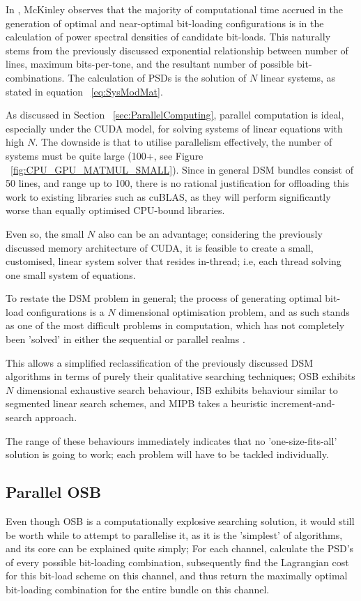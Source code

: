 In \cite{AM09}, McKinley observes that the majority of computational time accrued in the generation of optimal and near-optimal bit-loading configurations is in the calculation of power spectral densities of candidate bit-loads. This naturally stems from the previously discussed exponential relationship between number of lines, maximum bits-per-tone, and the resultant number of possible bit-combinations. The calculation of PSDs is the solution of \(N\) linear systems, as stated in equation ~\eqref{eq:SysModMat}.

As discussed in Section ~\ref{sec:ParallelComputing}, parallel computation is ideal, especially under the CUDA model, for solving systems of linear equations with high \(N\). The downside is that to utilise parallelism effectively, the number of systems must be quite large (100+, see Figure ~\ref{fig:CPU_GPU_MATMUL_SMALL}). Since in general DSM bundles consist of 50 lines, and range up to 100, there is no rational justification for offloading this work to existing libraries such as cuBLAS, as they will perform significantly worse than equally optimised CPU-bound libraries.

Even so, the small \(N\) also can be an advantage; considering the previously discussed memory architecture of CUDA, it is feasible to create a small, customised, linear system solver that resides in-thread; i.e, each thread solving one small system of equations. 

To restate the DSM problem in general; the process of generating optimal bit-load configurations is a \(N\) dimensional optimisation problem, and as such stands as one of the most difficult problems in computation, which has not completely been 'solved' in either the sequential or parallel realms \cite{JDJZW03}.

This allows a simplified reclassification of the previously discussed DSM algorithms in terms of purely their qualitative searching techniques; OSB exhibits \(N\) dimensional exhaustive search behaviour, ISB exhibits behaviour similar to segmented linear search schemes, and MIPB takes a heuristic increment-and-search approach. 

The range of these behaviours immediately indicates that no 'one-size-fits-all' solution is going to work; each problem will have to be tackled individually.

\subsection{Parallel OSB}
Even though OSB is a computationally explosive searching solution, it would still be worth while to attempt to parallelise it, as it is the 'simplest' of algorithms, and its core can be explained quite simply; For each channel, calculate the PSD's of every possible bit-loading combination, subsequently find the Lagrangian cost for this bit-load scheme on this channel, and thus return the maximally optimal bit-loading combination for the entire bundle on this channel. 

